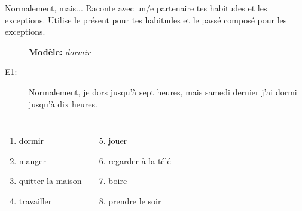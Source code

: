 \documentclass{beamer}
\begin{document}
  \begin{frame}{Normalement, mais...}
    Raconte avec un/e partenaire tes habitudes et les exceptions.
    Utilise \alert{le présent} pour tes habitudes et \alert{le passé composé} pour les exceptions. \\
    \begin{description}
      \item[] \textbf{Modèle:} \emph{dormir}
      \item[E1:] Normalement, je \alert{dors} jusqu'à sept heures, mais samedi dernier j'\alert{ai dormi} jusqu'à dix heures.
    \end{description}
    \begin{columns}[t]
        \begin{enumerate}
          \item dormir
          \item manger
          \item quitter la maison
          \item travailler
        \end{enumerate}
        \begin{enumerate}
          \setcounter{enumi}{4}
          \item jouer
          \item regarder à la télé
          \item boire
          \item prendre le soir
        \end{enumerate}
    \end{columns}
  \end{frame}
\end{document}
